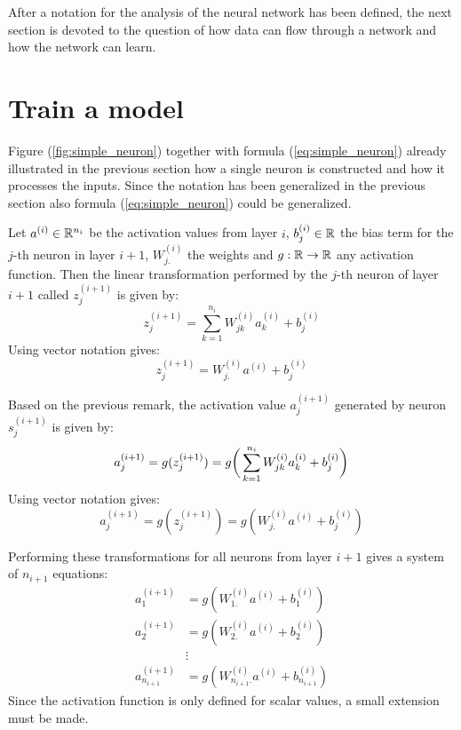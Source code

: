 After a notation for the analysis of the neural network has been defined, the next section is devoted to the question of how data can flow through a network and how the network can learn. 

\section{Train a model}

Figure (\ref{fig:simple_neuron}) together with formula (\ref{eq:simple_neuron}) already illustrated in the previous section how a single neuron is constructed and how it processes the inputs. Since the notation has been generalized in the previous section also formula (\ref{eq:simple_neuron}) could be generalized. 

\begin{remark}
	Let $a^{(i)} \in \mathbb{R}^{n_i}$ be the activation values from layer $i$, $b_j^{(i)} \in \mathbb{R}$ the bias term for the $j$-th neuron in layer $i+1$, $W_{j.}^{(i)}$ the weights and $g: \mathbb{R} \rightarrow \mathbb{R}$ any activation function. Then the linear transformation performed by the $j$-th neuron of layer $i+1$ called $z_j^{(i+1)}$ is given by:
	\begin{equation}
		z_j^{(i+1)} = \sum_{k=1}^{n_i} W_{jk}^{(i)} a_k^{(i)} + b_j^{(i)}
	\end{equation}
	Using vector notation gives:
	\begin{equation}
		z_j^{(i+1)} = W_{j.}^{(i)} a^{(i)} + b_j^{(i)}
	\end{equation}	
\end{remark}

\begin{remark}
	Based on the previous remark, the activation value $a_j^{(i+1)}$ generated by neuron $s_j^{(i+1)}$ is given by: 
	\begin{equation}
		a_j^{(i+1)} = g(z_j^{(i+1)}) = g \bigg( \sum_{k=1}^{n_i} W_{jk}^{(i)} a_k^{(i)} + b_j^{(i)} \bigg) \\
	\end{equation}
	Using vector notation gives:
	\begin{equation}
		a_j^{(i+1)} = g(z_j^{(i+1)}) = g( W_{j.}^{(i)} a^{(i)} + b_j^{(i)} )
	\end{equation}	
\end{remark}

Performing these transformations for all neurons from layer $i+1$ gives a system of $n_{i+1}$ equations:
\begin{align*}
	a_1^{(i+1)} &= g( W_{1.}^{(i)} a^{(i)} + b_1^{(i)} ) 	\\
	a_2^{(i+1)} &= g( W_{2.}^{(i)} a^{(i)} + b_2^{(i)} ) 	\\
				&\vdots										\\	
	a_{n_{i+1}}^{(i+1)} &= g( W_{n_{i+1}.}^{(i)} a^{(i)} + b_{n_{i+1}}^{(i)} )
\end{align*}
Since the activation function is only defined for scalar values, a small extension must be made.

